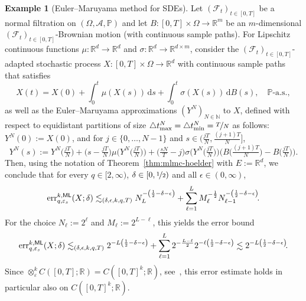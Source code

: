 \documentclass[reqno]{amsart}
\numberwithin{equation}{section}
\newcommand{\bbN}{\mathbb{N}}
\newcommand{\bbP}{\mathbb{P}}
\newcommand{\bbR}{\mathbb{R}}
\newcommand{\cA}{\mathcal{A}}
\newcommand{\cF}{\mathcal{F}}
\newcommand{\xkeps}{\otimes^k_\varepsilon}
\newcommand{\rd}{\mathrm{d}}
\newcommand{\from}{\colon}
\newcommand{\eps}{\varepsilon}
\theoremstyle{remark}
\theoremstyle{definition}
\newtheorem{example}[lemma]{Example}
\begin{document}
\begin{example}[Euler--Maruyama method for SDEs] 
	Let $(\cF_t)_{t\in[0,T]}$ be a normal filtration on 
	$(\Omega,\cA,\bbP)$ and let 
	$B\from[0,T]\times\Omega\to\bbR^m$ be 
	an $m$-dimensional 
	$(\cF_t)_{t\in[0,T]}$-Brownian motion 
	(with continuous sample paths). 
	For Lipschitz continuous functions 
	$\mu\from\bbR^d\to \bbR^d$ and 
	$\sigma\from\bbR^d \to\bbR^{d\times m}$\!, 
	consider the $(\cF_t)_{t\in[0,T]}$-adapted 
	stochastic process 
	$X\colon[0,T]\times\Omega\to\bbR^d$ 
	with continuous sample paths 
	that satisfies 
	\[
	X(t)  
	= 
	X(0) 
	+ 
	\int_0^t \mu(X(s)) \, \rd s 
	+ 
	\int_0^t \sigma(X(s)) \, \rd B(s), 
	\quad 
	\text{$\bbP$-a.s.}, 
	\]
	as well as the Euler--Maruyama 
	approximations 
	$(Y^N)_{N\in\bbN}$ 
	to $X$, defined 
	with respect to equidistant partitions 
	of size 
	$\triangle t^N_{\max} = 
	\triangle t^N_{\min} = \nicefrac{T}{N}$
	as follows: $Y^N\!(0) := X(0)$, 
	and for $j\in\{0,\ldots,N-1\}$ 
	and $s\in\bigl( \tfrac{jT}{N}, \tfrac{(j+1)T}{N} \bigr]$, 
	\[
	Y^N\!(s) 
	:= 
	Y^N\!\bigl( \tfrac{jT}{N} \bigr) 
	+ 
	\bigl( s - \tfrac{jT}{N} \bigr) 
	\mu\bigl( Y^N\!\bigl(\tfrac{jT}{N} \bigr) \bigr) 
	+ 
	\bigl( \tfrac{sN}{T} - j \bigr)
	\sigma\bigl( Y^N\!\bigl( \tfrac{jT}{N} \bigr) \bigr)
	\bigl( B\bigl( \tfrac{(j+1)T}{N} \bigr) 
	- B\bigl(\tfrac{jT}{N} \bigr) \bigr).  
	\]
	Then, using the notation of 
	Theorem~\ref{thm:mlmc-hoelder} 
	with $E:=\bbR^d$\!, 
	we conclude that 
	for every $q\in[2,\infty)$, $\delta\in[0,\nicefrac{1}{2})$ and 
	all $\epsilon\in(0,\infty)$, 
	\[ 
	\mathrm{err}_{q, \eps_s}^{k,\sf ML} (X;\delta) 
	\lesssim_{(\delta,\epsilon,k,q,T)} 
	N_L^{-\left(\frac{1}{2}-\delta-\epsilon\right)} 
	+ 
	\sum_{\ell=1}^{L}   
	M_\ell^{- \frac{1}{2} }  
	N_{\ell-1}^{-\left( \frac{1}{2} - \delta - \epsilon \right) } \!. 
	\] 
	For the choice 
	$N_\ell := 2^\ell$ 
	and $M_\ell := 2^{L-\ell}$\!, 
	this yields the error bound 
	\[ 
	\mathrm{err}_{q,\eps_s}^{k,\sf ML} (X;\delta) 
	\lesssim_{(\delta,\epsilon,k,q,T)} 
	2^{-L\left(\frac{1}{2}-\delta-\epsilon\right)} 
	+ 
	\sum_{\ell=1}^{L}   
	2^{- \frac{L-\ell}{2} }  
	2^{-\ell\left( \frac{1}{2} - \delta - \epsilon \right) }  
	\lesssim 
	2^{-L\left(\frac{1}{2}-\delta-\epsilon\right)} \!.  
	\] 
	Since $\xkeps C([0,T]; \bbR) 
	= C([0,T]^k; \bbR)$, 
	see~\cite[Section~3.2, p.~50]{Ryan2002}, 
	this error estimate holds in particular 
	also on $C([0,T]^k; \bbR)$. 
\end{example} 
\end{document}
